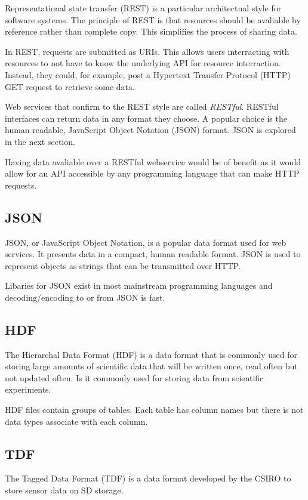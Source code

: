 Representational state transfer (REST) is a particular architectual style for software systems. The principle of REST is that resources should be avaliable by reference rather than complete copy. This simplifies the process of sharing data. 

In REST, requests are submitted as URIs. This allows users interracting with resources to not have to know the underlying API for resource interraction. Instead, they could, for example, post a Hypertext Transfer Protocol (HTTP) GET request to retrieve some data. 

Web services that confirm to the REST style are called \textit{RESTful}. RESTful interfaces can return data in any format they choose. A popular choice is the human readable, JavaScript Object Notation (JSON) format. JSON is explored in the next section.

Having data avaliable over a RESTful webservice would be of benefit as it would allow for an API accessible by any programming language that can make HTTP requests.

\subsection{JSON}

JSON, or JavaScript Object Notation, is a popular data format used for web services. It presents data in a compact, human readable format. JSON is used to represent objects as strings that can be transmitted over HTTP. 

Libaries for JSON exist in most mainstream programming languages and decoding/encoding to or from JSON is fast.

\subsection{HDF}
The Hierarchal Data Format (HDF) is a data format that is commonly used for storing large amounts of scientific data that will be written once, read often but not updated often. Is it commonly used for storing data from scientific experiments. 

HDF files contain groups of tables. Each table has column names but there is not data types associate with each column.

\subsection{TDF}
The Tagged Data Format (TDF) is a data format developed by the CSIRO to store sensor data on SD storage.


